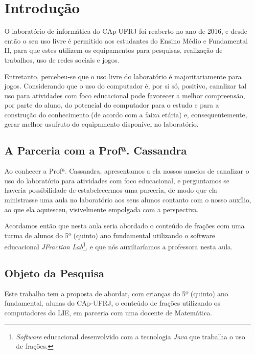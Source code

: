 \chapter{Introdução}\label{chp:LABEL_CHP_INT}

O laboratório de informática do CAp-UFRJ foi reaberto no ano de 2016, e desde então o seu uso livre é permitido aos estudantes do Ensino Médio e Fundamental II, para que estes utilizem os equipamentos para pesquisas, realização de trabalhos, uso de redes sociais e jogos.

Entretanto, percebeu-se que o uso livre do laboratório é majoritariamente para jogos. Considerando que o uso do computador é, por si só, positivo, canalizar tal uso para atividades com foco educacional pode favorecer a melhor compreensão, por parte do aluno, do potencial do computador para o estudo e para a construção do conhecimento (de acordo com a faixa etária) e, consequentemente, gerar melhor usufruto do equipamento disponível no laboratório.

\section{A Parceria com a Profª. Cassandra}\label{chp:LABEL_CHP_INT_SEC_PARC}

Ao conhecer a Profª. Cassandra, apresentamos a ela nossos anseios de canalizar o uso do laboratório para atividades com foco educacional, e perguntamos se haveria possibilidade de estabelecermos uma parceria, de modo que ela ministrasse uma aula no laboratório aos seus alunos contanto com o nosso auxílio, ao que ela aquiesceu, visivelmente empolgada com a perspectiva.

Acordamos então que nesta aula seria abordado o conteúdo de frações com uma turma de alunos do 5º (quinto) ano fundamental utilizando o software educacional \textit{JFraction Lab}\footnote{\textit{Software} educacional desenvolvido com a tecnologia \textit{Java} que trabalha o uso de frações.}, e que nós auxiliaríamos a professora nesta aula.

\section{Objeto da Pesquisa}\label{chp:LABEL_CHP_INT_SEC_OBJ}

Este trabalho tem a proposta de abordar, com crianças do 5º (quinto) ano fundamental, alunas do CAp-UFRJ, o conteúdo de frações utilizando os computadores do LIE, em parceria com uma docente de Matemática.

